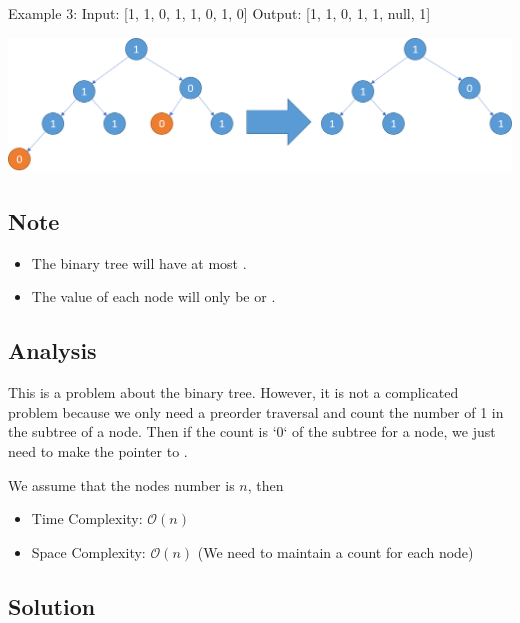 \begin{example}
\begin{multilinecode}
Example 3:
Input: [1, 1, 0, 1, 1, 0, 1, 0]
Output: [1, 1, 0, 1, 1, null, 1]
\end{multilinecode}
\includegraphics*[width=14cm]{figs/algo_814_3}
\end{example}

\subsection*{Note}
\begin{itemize}
\item The binary tree will have at most .
\item The value of each node will only be  or .
\end{itemize}

\subsection*{Analysis}
This is a problem about the binary tree. However, it is not a complicated problem because we only need a preorder traversal and count the number of 1 in the subtree of a node. Then if the count is `0` of the subtree for a node, we just need to make the pointer to .

We assume that the nodes number is $n$, then
\begin{itemize}
\item Time Complexity: $\mathcal{O}(n)$
\item Space Complexity: $\mathcal{O}(n)$ (We need to maintain a count for each node)
\end{itemize}

\subsection*{Solution}
